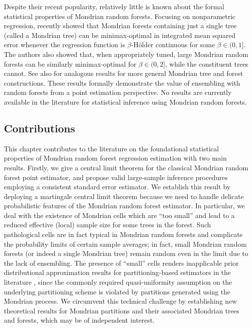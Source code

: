 Despite their recent popularity, relatively little is known about the formal
statistical properties of Mondrian random forests. Focusing on nonparametric
regression, \citet{mourtada2020minimax} recently showed that Mondrian forests
containing just a single tree (called a Mondrian tree) can be minimax-optimal
in integrated mean squared error whenever the regression function is
$\beta$-H{\"o}lder continuous for some $\beta \in (0, 1]$. The authors also
showed that, when appropriately tuned, large Mondrian random forests can be
similarly minimax-optimal for $\beta \in (0, 2]$, while the constituent trees
cannot. See also \citet{o2022stochastic} for analogous results for more general
Mondrian tree and forest constructions. These results formally demonstrate the
value of ensembling with random forests from a point estimation perspective. No
results are currently available in the literature for statistical inference
using Mondrian random forests.

\subsection{Contributions}

This chapter contributes to the literature on the foundational statistical
properties of Mondrian random forest regression estimation with two main
results. Firstly, we give a central limit theorem for the classical Mondrian
random forest point estimator, and propose valid large-sample inference
procedures employing a consistent standard error estimator. We establish this
result by deploying a martingale central limit theorem
\citep[Theorem~3.2]{hall2014martingale} because we need to handle delicate
probabilistic features of the Mondrian random forest estimator. In particular,
we deal with the existence of Mondrian cells which are ``too small'' and lead
to a reduced effective (local) sample size for some trees in the forest. Such
pathological cells are in fact typical in Mondrian random forests and
complicate the probability limits of certain sample averages; in fact, small
Mondrian random forests (or indeed a single Mondrian tree) remain random even
in the limit due to the lack of ensembling. The presence of ``small'' cells
renders inapplicable prior distributional approximation results for
partitioning-based estimators in the literature
\citep{huang2003local,cattaneo2020large}, since the commonly required
quasi-uniformity assumption on the underlying partitioning scheme is violated
by partitions generated using the Mondrian process. We circumvent this
technical challenge by establishing new theoretical results for Mondrian
partitions and their associated Mondrian trees and forests, which may be of
independent interest.

